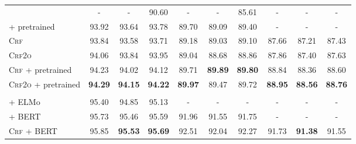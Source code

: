 \begin{table*}[tb!]
\begin{tabularx}{\textwidth}{lccccccccc}
    \citet{vilares-etal-2019-better}                 & -                        & -                          & 90.60                    & -                        & -                        & 85.61                    & -              & -              & -              \\
    \citet{zhou-zhao-2019-head} + pretrained         & 93.92                    & 93.64                      & 93.78                    & 89.70                    & 89.09                    & 89.40                    & -              & -              & -              \\[3pt]
    \textsc{Crf}                                     & 93.84                    & 93.58                      & 93.71                    & 89.18                    & 89.03                    & 89.10                    & 87.66          & 87.21          & 87.43          \\
    \textsc{Crf2o}                                   & 94.06                    & 93.84                      & 93.95                    & 89.04                    & 88.68                    & 88.86                    & 87.86          & 87.40          & 87.63          \\
    \textsc{Crf} + pretrained                        & 94.23                    & 94.02                      & 94.12                    & 89.71                    & \textbf{89.89}           & \textbf{89.80}           & 88.84          & 88.36          & 88.60          \\
    \textsc{Crf2o} + pretrained                      & \textbf{94.29}           & \textbf{94.15}             & \textbf{94.22}           & \textbf{89.97}           & 89.47                    & 89.72                    & \textbf{88.95} & \textbf{88.56} & \textbf{88.76} \\[1pt]
    \midrule
    \\[-20pt]
    \citet{kitaev-klein-2018-constituency} + ELMo    & 95.40                    & 94.85                      & 95.13                    & -                        & -                        & -                        & -              & -              & -              \\
    \citet{kitaev-etal-2019-multilingual} + BERT     & 95.73                    & 95.46                      & 95.59                    & 91.96                    & 91.55                    & 91.75                    & -              & -              & -              \\[3pt]
    \textsc{Crf} + BERT                              & 95.85                    & \textbf{95.53}             & \textbf{95.69}           & 92.51                    & 92.04                    & 92.27                    & 91.73          & \textbf{91.38} & 91.55          \\

\end{tabularx}
\end{table*}
